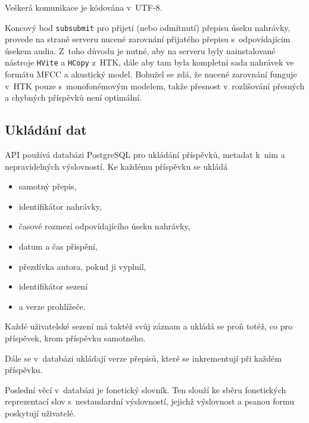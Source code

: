 Veškerá komunikace je kódována v~UTF-8.

Koncový bod \texttt{subsubmit} pro přijetí (nebo odmítnutí) přepisu úseku
nahrávky, provede na straně serveru nucené zarovnání přijatého přepisu
s~odpovídajícím úsekem audia. Z~toho důvodu je nutné, aby na serveru byly
nainstalované nástroje \texttt{HVite} a \texttt{HCopy} z~HTK, dále aby tam byla
kompletní sada nahrávek ve formátu MFCC a akustický model. Bohužel se zdá, že
nucené zarovnání funguje v~HTK pouze s~monofonémovým modelem, takže přesnost
v~rozlišování přesných a chybných příspěvků není optimální.

\subsection{Ukládání dat}

API používá databázi PostgreSQL pro ukládání příspěvků, metadat k~nim a nepravidelných
výslovností. Ke každému příspěvku se ukládá
\begin{itemize}
\item{samotný přepis,}
\item{identifikátor nahrávky,}
\item{časové rozmezí odpovídajícího úseku nahrávky,}
\item{datum a čas přispění,}
\item{přezdívka autora, pokud ji vyplnil,}
\item{identifikátor sezení}
\item{a verze prohlížeče.}
\end{itemize}

Každé uživatelské sezení má taktéž svůj záznam a ukládá se proň totéž, co pro
příspěvek, krom příspěvku samotného.

Dále se v~databázi ukládají verze přepisů, které se inkrementují při každém
příspěvku.

Poslední věcí v~databázi je fonetický slovník. Ten slouží ke sběru fonetických
reprezentací slov s~nestandardní výslovností, jejichž výslovnost a psanou formu
poskytují uživatelé.
